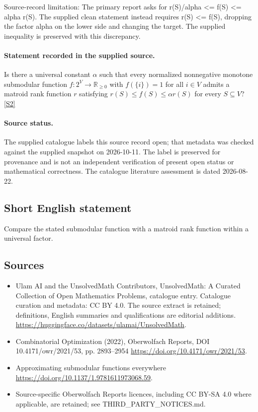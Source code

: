 \documentclass[11pt]{article}
\begin{document}
Source-record limitation: The primary report asks for r(S)/alpha <= f(S) <= alpha r(S). The supplied clean statement instead requires r(S) <= f(S), dropping the factor alpha on the lower side and changing the target. The supplied inequality is preserved with this discrepancy.
\paragraph{Statement recorded in the supplied source.}
Is there a universal constant $\alpha$ such that every normalized nonnegative monotone submodular function $f:2^V\to\mathbb R_{\geq0}$ with $f(\{i\})=1$ for all $i\in V$ admits a matroid rank function $r$ satisfying $r(S)\leq f(S)\leq\alpha r(S)$ for every $S\subseteq V$? \href{https://doi.org/10.4171/owr/2021/53}{[S2]}
\paragraph{Source status.}
The supplied catalogue labels this source record open; that metadata was checked against the supplied snapshot on 2026-10-11. The label is preserved for provenance and is not an independent verification of present open status or mathematical correctness. The catalogue literature assessment is dated 2026-08-22.
\subsection{Short English statement}
Compare the stated submodular function with a matroid rank function within a universal factor.
\subsection{Sources}
\begin{itemize}
\item[S1] Ulam AI and the UnsolvedMath Contributors, UnsolvedMath: A Curated Collection of Open Mathematics Problems, catalogue entry. Catalogue curation and metadata: CC BY 4.0. The source extract is retained; definitions, English summaries and qualifications are editorial additions.
\url{https://huggingface.co/datasets/ulamai/UnsolvedMath}.
\item[S2] Combinatorial Optimization (2022), Oberwolfach Reports, DOI 10.4171/owr/2021/53, pp. 2893--2954
\url{https://doi.org/10.4171/owr/2021/53}.
\item[S3] Approximating submodular functions everywhere
\url{https://doi.org/10.1137/1.9781611973068.59}.
\item Source-specific Oberwolfach Reports licences, including CC BY-SA 4.0 where applicable, are retained; see THIRD\_PARTY\_NOTICES.md.
\end{itemize}
\end{document}
